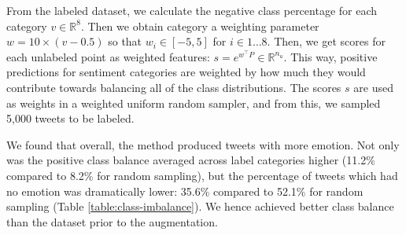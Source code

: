 \documentclass[letterpaper]{article} \usepackage{aaai19}  \usepackage{times}  \usepackage{helvet}  \usepackage{courier}  \usepackage{url}  \usepackage{graphicx}  \usepackage{booktabs}
\begin{document}
From the labeled dataset, we calculate the negative class percentage for each category $v \in \mathbb{R}^{8}$. Then we obtain category a weighting parameter $w = 10 \times (v - 0.5)$ so that $w_i \in [-5, 5]$ for $i \in 1\ldots8.$ Then, we get scores for each unlabeled point as weighted features: $s = e^{w^{\top}P} \in \mathbb{R}^{n_u}$. This way, positive predictions for sentiment categories are weighted by how much they would contribute towards balancing all of the class distributions. The scores $s$ are used as weights in a weighted uniform random sampler, and from this, we sampled 5,000 tweets to be labeled. 

We found that overall, the method produced tweets with more emotion. Not only was the positive class balance averaged across label categories higher (11.2\% compared to 8.2\% for random sampling),  but the percentage of tweets which had no emotion was dramatically lower: 35.6\% compared to 52.1\% for random sampling (Table \ref{table:class-imbalance}). We hence achieved better class balance than the dataset prior to the augmentation. 

\begin{table*}[!htpb]
\centering
\caption{Binary sentiment accuracy. The SST dataset includes Positive and Negative labels. Other datasets include Neutral labels. Third party results (Watson and Google) thresholded on the test set. }
\label{table:binary-results}
\end{table*}
\end{document}
